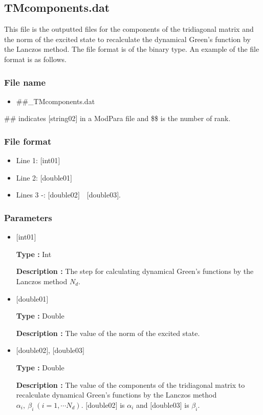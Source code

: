 \newpage
\subsection{{TMcomponents.dat}}
This file is the outputted files for the components of the tridiagonal matrix and the norm of the excited state to recalculate  the dynamical Green's function by the Lanczos method.  The file format is of the binary type. An example of the file format is as follows.

\subsubsection{File name}
\begin{itemize}
   \item{\#\#\_TMcomponents.dat}
\end{itemize}
\#\# indicates [string02] in a ModPara file and \$\$ is the number of rank. 

\subsubsection{File format}
 \begin{itemize}
   \item  Line 1: $[$int01$]$
   \item  Line 2: $[$double01$]$
   \item  Lines 3 -: $[$double02$]$~~$[$double03$]$.
  \end{itemize}
  
\subsubsection{Parameters}
 \begin{itemize}

  \item  $[$int01$]$

 {\bf Type :} Int

 {\bf Description :} The step for calculating dynamical Green's functions by the Lanczos method $N_d$.

  \item  $[$double01$]$

 {\bf Type :} Double

{\bf Description :} The value of the norm of the excited state.
 
 \item  $[$double02$]$, $[$double03$]$

 {\bf Type :} Double

{\bf Description :} The value of the components of the tridiagonal matrix to recalculate dynamical Green's functions by the Lanczos method $\alpha_i,~\beta_i~(i =1,\cdots N_d)$.
$[$double02$]$ is $\alpha_i$ and $[$double03$]$ is $\beta_i$.\\
\end{itemize}

